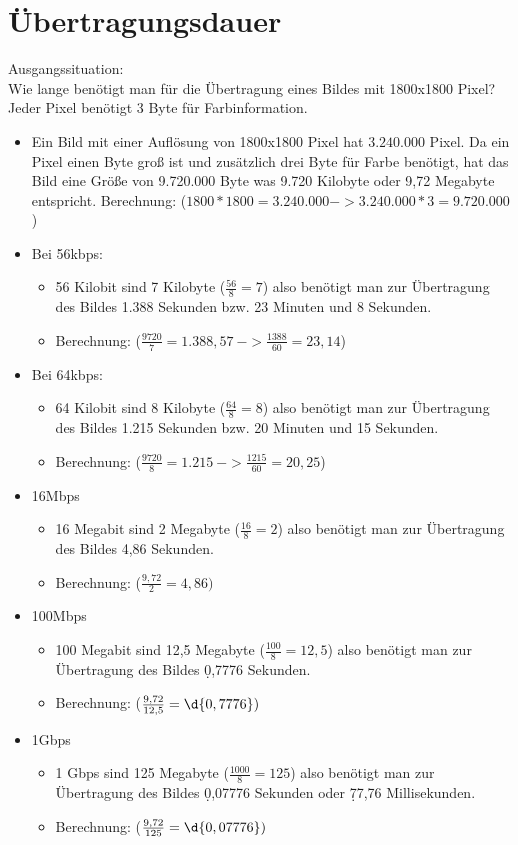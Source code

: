 \documentclass{article}
\begin{document}
	\section{Übertragungsdauer}
	Ausgangssituation: \\
	Wie lange benötigt man für die Übertragung eines Bildes mit 1800x1800 Pixel? Jeder Pixel benötigt 3 Byte für Farbinformation.
	\begin{itemize}
		\item{Ein Bild mit einer Auflösung von 1800x1800 Pixel hat $3.240.000$ Pixel. Da ein Pixel einen Byte groß ist und zusätzlich drei Byte für Farbe benötigt, hat das Bild eine Größe von 9.720.000 Byte was 9.720 Kilobyte oder 9,72 Megabyte entspricht. Berechnung: ($1800 * 1800 = 3.240.000 -> 3.240.000 * 3 = 9.720.000$)}
	\end{itemize}
	\begin{itemize}
		\item{Bei 56kbps:}
		\begin{itemize}
			\item{56 Kilobit sind 7 Kilobyte ($\frac{56}{8} = 7$) also benötigt man zur Übertragung des Bildes 1.388 Sekunden bzw. 23 Minuten und 8 Sekunden.}
			\item{Berechnung: ($\frac{9720}{7} = 1.388,57\ -> \frac{1388}{60} = 23,14$)}
		\end{itemize}
		\item{Bei 64kbps:}
		\begin{itemize}
			\item{64 Kilobit sind 8 Kilobyte ($\frac{64}{8} = 8$) also benötigt man zur Übertragung des Bildes 1.215 Sekunden bzw. 20 Minuten und 15 Sekunden.}
			\item{Berechnung: ($\frac{9720}{8} = 1.215\ -> \frac{1215}{60} = 20,25$)}
		\end{itemize}
		\item{16Mbps}
		\begin{itemize}
			\item{16 Megabit sind 2 Megabyte ($\frac{16}{8} = 2$) also benötigt man zur Übertragung des Bildes 4,86 Sekunden.}
			\item{Berechnung: ($\frac{9,72}{2} = 4,86)$}
		\end{itemize}
		\item{100Mbps}
		\begin{itemize}
			\item{100 Megabit sind 12,5 Megabyte ($\frac{100}{8} = 12,5$) also benötigt man zur Übertragung des Bildes \d{0,7776} Sekunden.}
			\item{Berechnung: ($\frac{9,72}{12,5} = \d{0,7776})$}
		\end{itemize}
		\item{1Gbps}
		\begin{itemize}
			\item{1 Gbps sind 125 Megabyte ($\frac{1000}{8} = 125$) also benötigt man zur Übertragung des Bildes \d{0,07776} Sekunden oder \d{77,76} Millisekunden.}
			\item{Berechnung: ($\frac{9,72}{125} = \d{0,07776})$}
		\end{itemize}
	\end{itemize}
\end{document}
